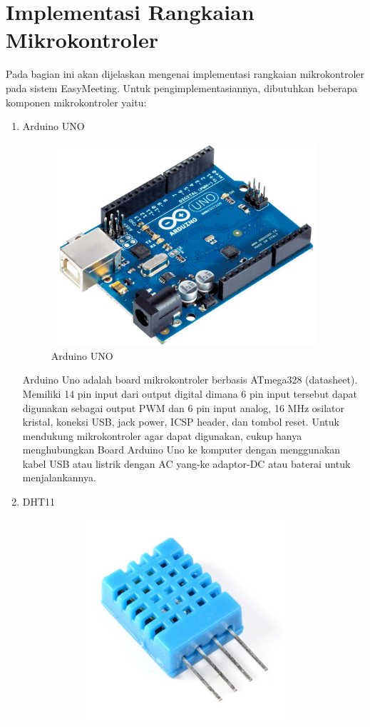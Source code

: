 \section{Implementasi Rangkaian Mikrokontroler}
\tab Pada bagian ini akan dijelaskan mengenai implementasi rangkaian mikrokontroler pada sistem EasyMeeting. Untuk pengimplementasiannya, dibutuhkan beberapa komponen mikrokontroler yaitu:
\begin{enumerate}
	\item Arduino UNO
	\begin{figure}[H]
		\centerline {
			\includegraphics[width=10cm,height=7.5cm]{bab5/img/ARDUINO.png}
		}
		\caption{Arduino UNO}
		\label{figure:arduino}
	\end{figure}
	\tab Arduino Uno adalah board mikrokontroler berbasis ATmega328 (datasheet). Memiliki 14 pin input dari output digital  dimana 6 pin input tersebut dapat digunakan sebagai output PWM dan 6 pin input analog, 16 MHz osilator kristal, koneksi USB, jack power, ICSP header, dan tombol reset. Untuk mendukung mikrokontroler agar dapat digunakan, cukup hanya menghubungkan Board Arduino Uno ke komputer dengan menggunakan kabel USB atau listrik dengan AC yang-ke adaptor-DC atau baterai untuk menjalankannya.
	\pagebreak
	\item DHT11
	\begin{figure}[H]
		\centerline {
			\includegraphics[width=10cm,height=7.5cm]{bab5/img/dht11.png}
}
\end{figure}
\end{enumerate}
